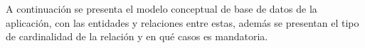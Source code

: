 \documentclass{memoria}
\begin{document}

A continuación se presenta el modelo conceptual de base de datos de la aplicación, con las entidades y relaciones entre estas, además se presentan el tipo de cardinalidad de la relación y en qué casos es mandatoria.


\end{document}
